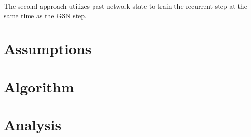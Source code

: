 The second approach utilizes past network state to train the recurrent step at the same time as the GSN step.

\section{Assumptions}

\section{Algorithm}

\section{Analysis}